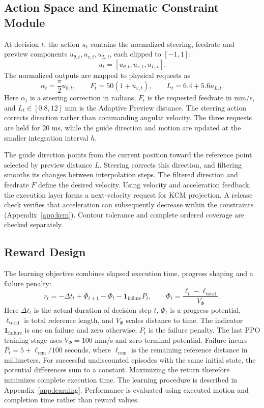 \documentclass[pdflatex,sn-apa]{sn-jnl}
\begin{document}
\subsection{Action Space and Kinematic Constraint Module}
At decision $t$, the action $u_t$ contains the normalized steering, feedrate and preview components $u_{\theta,t},u_{v,t},u_{L,t}$, each clipped to $[-1,1]$:
\begin{equation}
u_t=[u_{\theta,t},u_{v,t},u_{L,t}].
\end{equation}
The normalized outputs are mapped to physical requests as
\begin{equation}
\alpha_t=\frac{\pi}{2}u_{\theta,t},\qquad
F_t=50(1+u_{v,t}),\qquad
L_t=6.4+5.6u_{L,t}.
\label{eq:decode}
\end{equation}
Here $\alpha_t$ is a steering correction in radians, $F_t$ is the requested feedrate in mm/s, and $L_t\in[0.8,12]$ mm is the Adaptive Preview distance. The steering action corrects direction rather than commanding angular velocity. The three requests are held for 20 ms, while the guide direction and motion are updated at the smaller integration interval $h$.

The guide direction points from the current position toward the reference point selected by preview distance $L$. Steering corrects this direction, and filtering smooths its changes between interpolation steps. The filtered direction and feedrate $F$ define the desired velocity. Using velocity and acceleration feedback, the execution layer forms a next-velocity request for KCM projection. A release check verifies that acceleration can subsequently decrease within the constraints (Appendix~\ref{app:kcm}). Contour tolerance and complete ordered coverage are checked separately.

\subsection{Reward Design}
The learning objective combines elapsed execution time, progress shaping and a failure penalty:
\begin{equation}
r_t=-\Delta t_t+\Phi_{t+1}-\Phi_t-\mathbf{1}_{\mathrm{failure}}P_t,
\qquad \Phi_t=\frac{\ell_t-\ell_{\mathrm{total}}}{V_\Phi}.
\label{eq:reward_total}
\end{equation}
Here $\Delta t_t$ is the actual duration of decision step $t$, $\Phi_t$ is a progress potential, $\ell_{\mathrm{total}}$ is total reference length, and $V_\Phi$ scales distance to time. The indicator $\mathbf{1}_{\mathrm{failure}}$ is one on failure and zero otherwise; $P_t$ is the failure penalty. The last PPO training stage uses $V_\Phi=100$ mm/s and zero terminal potential. Failure incurs $P_t=5+\ell_{\mathrm{rem}}/100$ seconds, where $\ell_{\mathrm{rem}}$ is the remaining reference distance in millimeters. For successful undiscounted episodes with the same initial state, the potential differences sum to a constant. Maximizing the return therefore minimizes complete execution time. The learning procedure is described in Appendix~\ref{app:learning}. Performance is evaluated using executed motion and completion time rather than reward values.
\end{document}
